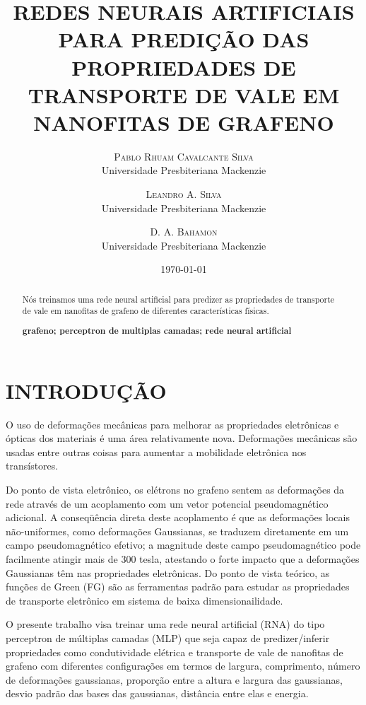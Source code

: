 \documentclass[a4paper,12pt]{article}
\title{REDES NEURAIS ARTIFICIAIS PARA PREDIÇÃO DAS PROPRIEDADES DE TRANSPORTE DE VALE EM NANOFITAS DE GRAFENO}
\author{%
	\textsc{Pablo Rhuam Cavalcante Silva}\\ %
	\normalsize Universidade Presbiteriana Mackenzie \\ %
	\and
	\textsc{Leandro A. Silva}\\%
	\normalsize Universidade Presbiteriana Mackenzie \\ %
	\and
	\textsc{D. A. Bahamon}\\%
	\normalsize Universidade Presbiteriana Mackenzie \\ %
}
\date{\today}
\begin{document}
	\maketitle
	
	\begin{abstract}
    Nós treinamos uma rede neural artificial para predizer as propriedades de  transporte de vale em nanofitas de grafeno de diferentes características físicas.
	
	\textbf{grafeno; perceptron de multiplas camadas; rede neural artificial}
	\end{abstract}
	
	\section{INTRODUÇÃO} \label{sec:introduction}
    O uso de deformações mecânicas para melhorar as propriedades eletrônicas e ópticas dos materiais é uma área relativamente nova. Deformações mecânicas são usadas entre outras coisas para aumentar a mobilidade eletrônica nos transístores.

    Do ponto de vista eletrônico, os elétrons no grafeno sentem as deformações da rede através de um acoplamento com um vetor potencial pseudomagnético adicional. A conseqüência direta deste acoplamento é que as deformações locais não-uniformes, como deformações Gaussianas, se traduzem diretamente em um campo pseudomagnético efetivo; a magnitude deste campo pseudomagnético pode facilmente atingir mais de 300 tesla, atestando o forte impacto que a deformações Gaussianas têm nas propriedades eletrônicas. Do ponto de vista teórico, as funções de Green (FG) \cite{bahamon2017} são as ferramentas padrão para estudar as propriedades de transporte eletrônico em sistema de baixa dimensionailidade.

    O presente trabalho visa treinar uma rede neural artificial (RNA) do tipo perceptron de múltiplas camadas (MLP) que seja capaz de predizer/inferir propriedades como condutividade elétrica e transporte de vale de nanofitas de grafeno com diferentes configurações em termos de largura, comprimento, número de deformações gaussianas, proporção entre a altura e largura das gaussianas, desvio padrão das bases das gaussianas, distância entre elas e energia.
		
		
\end{document}
